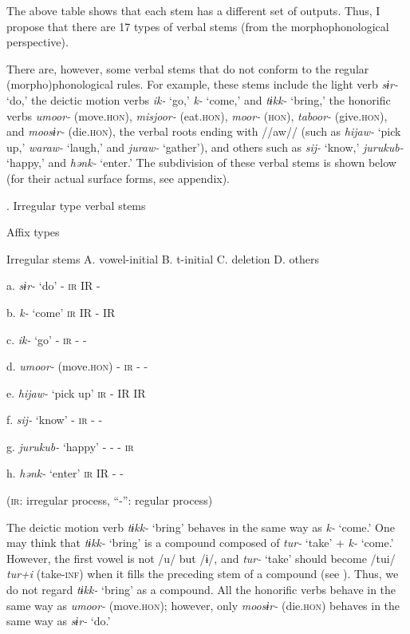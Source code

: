 The above table shows that each stem has a different set of outputs. Thus, I propose that there are 17 types of verbal stems (from the morphophonological perspective).

There are, however, some verbal stems that do not conform to the regular (morpho)phonological rules. For example, these stems include the light verb \textit{sɨr-} ‘do,’ the deictic motion verbs \textit{ik-} ‘go,’ \textit{k-} ‘come,’ and \textit{tɨkk-} ‘bring,’ the honorific verbs \textit{umoor-} (move.\textsc{hon}), \textit{misjoor-} (eat.\textsc{hon}), \textit{moor-} (\textsc{hon}), \textit{taboor-} (give.\textsc{hon}), and \textit{moosɨr-} (die.\textsc{hon}), the verbal roots ending with //aw// (such as \textit{hijaw-} ‘pick up,’ \textit{waraw-} ‘laugh,’ and \textit{juraw-} ‘gather’), and others such as \textit{sij-} ‘know,’ \textit{jurukub-} ‘happy,’ and \textit{hənk-} ‘enter.’ The subdivision of these verbal stems is shown below (for their actual surface forms, see appendix).

\begin{table}
\caption{\label{tab:key:59}. Irregular type verbal stems}

    Affix types

Irregular stems    A. vowel-initial  B. t-initial  C. deletion  D. others

a.  \textit{sɨr-} ‘do’    -  \textsc{ir}  IR  -

b.  \textit{k-} ‘come’    \textsc{ir}  IR  -  IR

c.  \textit{ik-} ‘go’    -  \textsc{ir}  -  -

d.  \textit{umoor-} (move.\textsc{hon})    -  \textsc{ir}  -  -

e.  \textit{hijaw-} ‘pick up’    \textsc{ir}  -  IR  IR

f.  \textit{sij-} ‘know’    -  \textsc{ir}  -  -

g.  \textit{jurukub-} ‘happy’    -  -  -  \textsc{ir}

h.  \textit{hənk-} ‘enter’    \textsc{ir}  IR  -  -

(\textsc{ir}: irregular process, “-”: regular process)
\end{table}

The deictic motion verb \textit{tɨkk-} ‘bring’ behaves in the same way as \textit{k-} ‘come.’ One may think that \textit{tɨkk-} ‘bring’ is a compound composed of \textit{tur-} ‘take’ + \textit{k-} ‘come.’ However, the first vowel is not /u/ but /ɨ/, and \textit{tur-} ‘take’ should become /tui/ \textit{tur+i} (take-\textsc{inf}) when it fills the preceding stem of a compound (see ). Thus, we do not regard \textit{tɨkk-} ‘bring’ as a compound. All the honorific verbs behave in the same way as \textit{umoor-} (move.\textsc{hon}); however, only \textit{moosɨr-} (die.\textsc{hon}) behaves in the same way as \textit{sɨr-} ‘do.’

